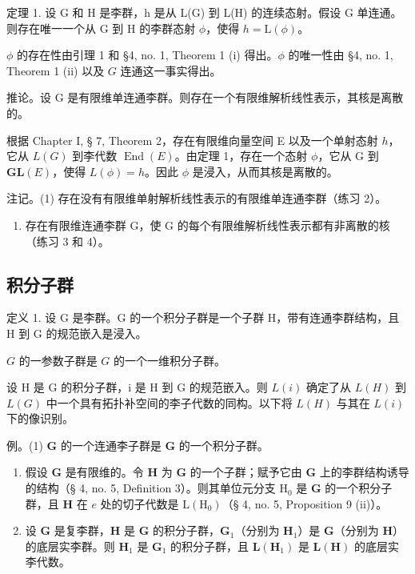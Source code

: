定理 1. 设 G 和 H 是李群，h 是从 L(G) 到 L(H) 的连续态射。假设 G 单连通。则存在唯一一个从 G 到 H 的李群态射 \(\phi\)，使得 \(h = \mathrm{L}(\phi)\)。

\(\phi\) 的存在性由引理 1 和 §4, no. 1, Theorem 1 (i) 得出。\(\phi\) 的唯一性由 §4, no. 1, Theorem 1 (ii) 以及 \(G\) 连通这一事实得出。

推论。设 G 是有限维单连通李群。则存在一个有限维解析线性表示，其核是离散的。

根据 Chapter I, § 7, Theorem 2，存在有限维向量空间 E 以及一个单射态射 \(h\)，它从 \(L(G)\) 到李代数 \(\operatorname{End}(E)\)。由定理 1，存在一个态射 \(\phi\)，它从 G 到 \(\mathbf{GL}(E)\)，使得 \(L(\phi) = h\)。因此 \(\phi\) 是浸入，从而其核是离散的。

注记。(1) 存在没有有限维单射解析线性表示的有限维单连通李群（练习 2）。

\begin{enumerate}
\def\labelenumi{(\arabic{enumi})}
\setcounter{enumi}{1}
\tightlist
\item
  存在有限维连通李群 G，使 G 的每个有限维解析线性表示都有非离散的核（练习 3 和 4）。
\end{enumerate}

\subsection{积分子群}

定义 1. 设 G 是李群。G 的一个积分子群是一个子群 H，带有连通李群结构，且 H 到 G 的规范嵌入是浸入。

\(G\) 的一参数子群是 \(G\) 的一个一维积分子群。

设 H 是 G 的积分子群，i 是 H 到 G 的规范嵌入。则 \(L(i)\) 确定了从 \(L(H)\) 到 \(L(G)\) 中一个具有拓扑补空间的李子代数的同构。以下将 \(L(H)\) 与其在 \(L(i)\) 下的像识别。

例。(1) \(\mathbf{G}\) 的一个连通李子群是 \(\mathbf{G}\) 的一个积分子群。

\begin{enumerate}
\def\labelenumi{(\arabic{enumi})}
\setcounter{enumi}{1}
\item
  假设 \(\mathbf{G}\) 是有限维的。令 \(\mathbf{H}\) 为 \(\mathbf{G}\) 的一个子群；赋予它由 \(\mathbf{G}\) 上的李群结构诱导的结构（§ 4, no. 5, Definition 3）。则其单位元分支 \(\mathrm{H}_0\) 是 \(\mathbf{G}\) 的一个积分子群，且 \(\mathbf{H}\) 在 \(e\) 处的切子代数是 \(\mathrm{L}(\mathrm{H}_0)\)（§ 4, no. 5, Proposition 9 (ii)）。
\item
  设 \(\mathbf{G}\) 是复李群，\(\mathbf{H}\) 是 \(\mathbf{G}\) 的积分子群，\(\mathbf{G}_1\)（分别为 \(\mathbf{H}_1\)）是 \(\mathbf{G}\)（分别为 \(\mathbf{H}\)）的底层实李群。则 \(\mathbf{H}_1\) 是 \(\mathbf{G}_1\) 的积分子群，且 \(\mathbf{L}(\mathbf{H}_1)\) 是 \(\mathbf{L}(\mathbf{H})\) 的底层实李代数。
\end{enumerate}

